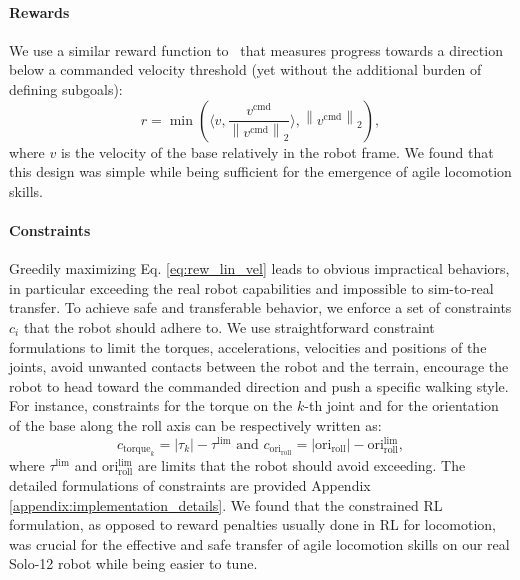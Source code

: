 \paragraph{Rewards}
We use a similar reward function to~\citep{cheng2023parkour} that measures progress towards a direction below a commanded velocity threshold (yet without the additional burden of defining subgoals):
\begin{equation}
\label{eq:rew_lin_vel}
r = \min( \langle v, \frac{v^\text{cmd}}{\left \| v^\text{cmd} \right \|_2} \rangle, \left \| v^\text{cmd} \right \|_2),
\end{equation}
where $v$ is the velocity of the base relatively in the robot frame.
We found that this design was simple while being sufficient for the emergence of agile locomotion skills.

\paragraph{Constraints}
Greedily maximizing Eq. \ref{eq:rew_lin_vel} leads to obvious impractical behaviors, in particular exceeding the real robot capabilities and impossible to sim-to-real transfer.
To achieve safe and transferable behavior, we enforce a set of constraints $c_i$ that the robot should adhere to.
We use straightforward constraint formulations to limit the torques, accelerations, velocities and positions of the joints, avoid unwanted contacts between the robot and the terrain, encourage the robot to head toward the commanded direction and push a specific walking style.
For instance, constraints for the torque on the $k$-th joint and for the orientation of the base along the roll axis can be respectively written as:
\begin{equation}
\label{eq:cstr_torque}
c_{\text{torque}_k} = | \tau_k | - \tau^\text{lim} \text{ and } c_{\text{ori}_\text{roll}} = | \text{ori}_\text{roll}| - \text{ori}_\text{roll}^\text{lim},
\end{equation}
where $\tau^\text{lim}$ and $\text{ori}_\text{roll}^\text{lim}$ are limits that the robot should avoid exceeding.
The detailed formulations of constraints are provided Appendix \ref{appendix:implementation_details}.
We found that the constrained RL formulation, as opposed to reward penalties usually done in RL for locomotion, was crucial for the effective and safe transfer of agile locomotion skills on our real Solo-12 robot while being easier to tune.

